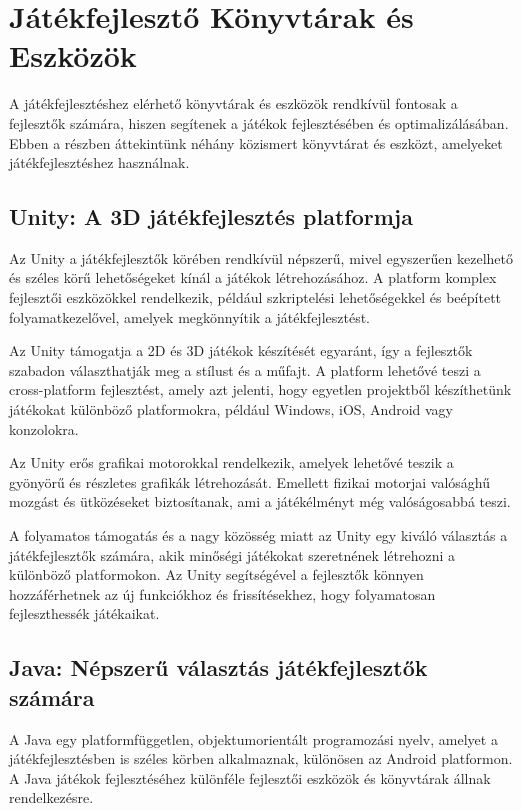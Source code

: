 \section{Játékfejlesztő Könyvtárak és Eszközök}

A játékfejlesztéshez elérhető könyvtárak és eszközök rendkívül fontosak a fejlesztők számára, hiszen segítenek a játékok fejlesztésében és optimalizálásában. Ebben a részben áttekintünk néhány közismert könyvtárat és eszközt, amelyeket játékfejlesztéshez használnak.

\subsection{Unity: A 3D játékfejlesztés platformja}\cite{unity-doc}
Az Unity a játékfejlesztők körében rendkívül népszerű, mivel egyszerűen kezelhető és széles körű lehetőségeket kínál a játékok létrehozásához. A platform komplex fejlesztői eszközökkel rendelkezik, például szkriptelési lehetőségekkel és beépített folyamatkezelővel, amelyek megkönnyítik a játékfejlesztést.

Az Unity támogatja a 2D és 3D játékok készítését egyaránt, így a fejlesztők szabadon választhatják meg a stílust és a műfajt. A platform lehetővé teszi a cross-platform fejlesztést, amely azt jelenti, hogy egyetlen projektből készíthetünk játékokat különböző platformokra, például Windows, iOS, Android vagy konzolokra.

Az Unity erős grafikai motorokkal rendelkezik, amelyek lehetővé teszik a gyönyörű és részletes grafikák létrehozását. Emellett fizikai motorjai valósághű mozgást és ütközéseket biztosítanak, ami a játékélményt még valóságosabbá teszi.

A folyamatos támogatás és a nagy közösség miatt az Unity egy kiváló választás a játékfejlesztők számára, akik minőségi játékokat szeretnének létrehozni a különböző platformokon. Az Unity segítségével a fejlesztők könnyen hozzáférhetnek az új funkciókhoz és frissítésekhez, hogy folyamatosan fejleszthessék játékaikat.
\subsection{Java: Népszerű választás játékfejlesztők számára}\cite{java-doc}
A Java egy platformfüggetlen, objektumorientált programozási nyelv, amelyet a játékfejlesztésben is széles körben alkalmaznak, különösen az Android platformon. A Java játékok fejlesztéséhez különféle fejlesztői eszközök és könyvtárak állnak rendelkezésre.

